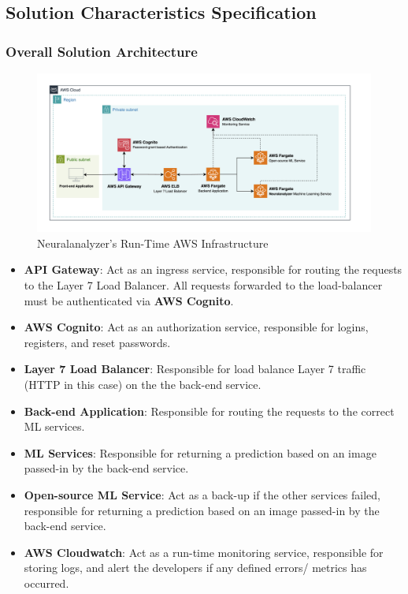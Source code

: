 \documentclass[12pt]{article}
\begin{document}
\subsection{Solution Characteristics Specification}
\subsubsection{Overall Solution Architecture}
\begin{figure}[h!]
  \centering
  \includegraphics[width=1\textwidth]{app-runtime.png}
  \caption{Neuralanalyzer's Run-Time AWS Infrastructure}
  \label{fig:overall-runtime-infra}
\end{figure}

\begin{itemize}
    \item \textbf{API Gateway}: Act as an ingress service, responsible for routing the requests to the Layer 7 Load Balancer. All requests forwarded to the load-balancer must be authenticated via \textbf{AWS Cognito}.
    \item \textbf{AWS Cognito}: Act as an authorization service, responsible for logins, registers, and reset passwords.
    \item \textbf{Layer 7 Load Balancer}: Responsible for load balance Layer 7 traffic (HTTP in this case) on the the back-end service.
    \item \textbf{Back-end Application}: Responsible for routing the requests to the correct ML services.
    \item \textbf{ML Services}: Responsible for returning a prediction based on an image passed-in by the back-end service.
    \item \textbf{Open-source ML Service}: Act as a back-up if the other services failed, responsible for returning a prediction based on an image passed-in by the back-end service.
    \item \textbf{AWS Cloudwatch}: Act as a run-time monitoring service, responsible for storing logs, and alert the developers if any defined errors/ metrics has occurred.
\end{itemize}
\end{document}

